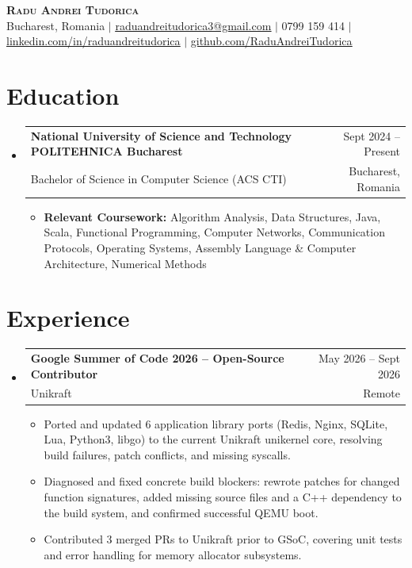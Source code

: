 \documentclass[letterpaper,11pt]{article}
\makeatletter
\newcommand{\resumeItem}[1]{
  \item\small{
    {#1 \vspace{-2pt}}
  }
}
\newcommand{\resumeSubheading}[4]{
  \vspace{-2pt}\item
    \begin{tabular*}{0.97\textwidth}[t]{l@{\extracolsep{\fill}}r}
      \textbf{#1} & #2 \\
      \small#3 & \small #4 \\
    \end{tabular*}\vspace{-7pt}
}
\newcommand{\resumeSubHeadingListStart}{\begin{itemize}[leftmargin=0.15in, label={}]}
\newcommand{\resumeSubHeadingListEnd}{\end{itemize}}
\newcommand{\resumeItemListStart}{\begin{itemize}}
\newcommand{\resumeItemListEnd}{\end{itemize}\vspace{-5pt}}
\makeatother
\begin{document}
\begin{center}
    \textbf{\Huge \scshape Radu Andrei Tudorica} \\ \vspace{1pt}
    \small Bucharest, Romania $|$
    \href{mailto:raduandreitudorica3@gmail.com}{\underline{raduandreitudorica3@gmail.com}} $|$
    \small 0799 159 414 $|$
    \href{https://linkedin.com/in/raduandreitudorica}{\underline{linkedin.com/in/raduandreitudorica}} $|$
    \href{https://github.com/RaduAndreiTudorica}{\underline{github.com/RaduAndreiTudorica}}
\end{center}


\section{Education}
  \resumeSubHeadingListStart
    \resumeSubheading
      {National University of Science and Technology POLITEHNICA Bucharest}{Sept 2024 -- Present}
      {Bachelor of Science in Computer Science (ACS CTI)}{Bucharest, Romania}
      \resumeItemListStart
        \resumeItem{\textbf{Relevant Coursework:} Algorithm Analysis, Data Structures, Java, Scala, Functional Programming, Computer Networks, Communication Protocols, Operating Systems, Assembly Language \& Computer Architecture, Numerical Methods}
      \resumeItemListEnd
  \resumeSubHeadingListEnd


\section{Experience}
  \resumeSubHeadingListStart
    \resumeSubheading
      {Google Summer of Code 2026 -- Open-Source Contributor}{May 2026 -- Sept 2026}
      {Unikraft}{Remote}
      \resumeItemListStart
        \resumeItem{Ported and updated 6 application library ports (Redis, Nginx, SQLite, Lua, Python3, libgo) to the current Unikraft unikernel core, resolving build failures, patch conflicts, and missing syscalls.}
        \resumeItem{Diagnosed and fixed concrete build blockers: rewrote patches for changed function signatures, added missing source files and a C++ dependency to the build system, and confirmed successful QEMU boot.}
        \resumeItem{Contributed 3 merged PRs to Unikraft prior to GSoC, covering unit tests and error handling for memory allocator subsystems.}
      \resumeItemListEnd
  \resumeSubHeadingListEnd


\end{document}
